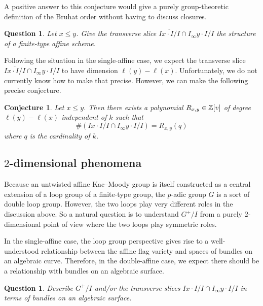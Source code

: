 \documentclass[10pt]{amsart}
\newtheorem{conj}[theo]{Conjecture}
\newtheorem{ques}[theo]{Question}
\begin{document}
A positive answer to this conjecture would give a purely group-theoretic definition of the Bruhat order without having to discuss closures.

\begin{ques}
Let $x \leq y$. Give the transverse slice $\overline{I x \cdot I/I} \cap I_\infty y \cdot I/I$ the structure of a finite-type affine scheme.
\end{ques}

Following the situation in the single-affine case, we expect the transverse slice $\overline{I x \cdot I/I} \cap I_\infty y \cdot I/I$ to have dimension $\ell(y) - \ell(x)$. Unfortunately, we do not currently know how to make that precise. However, we can make the following precise conjecture.

\begin{conj}
Let $x \leq y$. Then there exists a polynomial $R_{x,y} \in \mathbb{Z}[v]$ of degree $\ell(y) - \ell(x)$ independent of $k$ such that
\begin{equation}\label{eq:29}
\# (I x \cdot I/I \cap I_\infty y \cdot I/I) = R_{x,y}(q)
\end{equation}
where $q$ is the cardinality of $k$.
\end{conj}

\subsection{\texorpdfstring{$2$}{2}-dimensional phenomena}

Because an untwisted affine Kac--Moody group is itself constructed as a central extension of a loop group of a finite-type group, the $p$-adic group $G$ is a sort of double loop group. However, the two loops play very different roles in the discussion above. So a natural question is to understand $G^+/I$ from a purely $2$-dimensional point of view where the two loops play symmetric roles.

In the single-affine case, the loop group perspective gives rise to a well-understood relationship between the affine flag variety and spaces of bundles on an algebraic curve. Therefore, in the double-affine case, we expect there should be a relationship with bundles on an algebraic surface.

\begin{ques}
Describe $G^+/I$ and/or the transverse slices $I x \cdot I/I \cap I_\infty y \cdot I/I$ in terms of bundles on an algebraic surface.
\end{ques}
\end{document}
